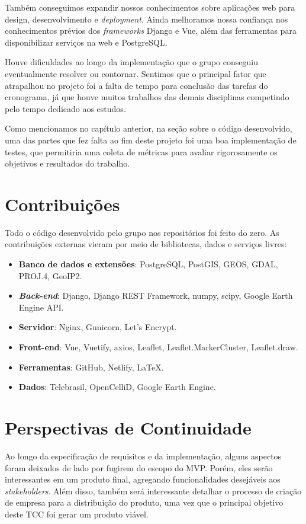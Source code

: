 \documentclass[]{politex}
\begin{document}
Também conseguimos expandir nossos conhecimentos sobre aplicações web
para design, desenvolvimento e \textit{deployment}. Ainda melhoramos nossa
confiança nos conhecimentos prévios dos \textit{frameworks} Django e Vue, além
das ferramentas para disponibilizar serviços na web e PostgreSQL.

Houve dificuldades ao longo da implementação que o grupo conseguiu
eventualmente resolver ou contornar. Sentimos que o principal fator que
atrapalhou no projeto foi a falta de tempo para conclusão das tarefas do
cronograma, já que houve muitos trabalhos das demais disciplinas competindo
pelo tempo dedicado aos estudos.

Como mencionamos no capítulo anterior, na seção sobre o código desenvolvido,
uma das partes que fez falta ao fim deste projeto foi uma boa implementação de
testes, que permitiria uma coleta de métricas para avaliar rigorosamente os
objetivos e resultados do trabalho.

\section{Contribuições}

Todo o código desenvolvido pelo grupo nos repositórios foi feito do zero. As
contribuições externas vieram por meio de bibliotecas, dados e serviços livres:

\begin{itemize}
\item \textbf{Banco de dados e extensões}: PostgreSQL, PostGIS, GEOS, GDAL,
PROJ.4, GeoIP2.
\item \textbf{\textit{Back-end}}: Django, Django REST Framework, numpy, scipy,
Google Earth Engine API.
\item \textbf{Servidor}: Nginx, Gunicorn, Let's Encrypt.
\item \textbf{Front-end}: Vue, Vuetify, axios, Leaflet, Leaflet.MarkerCluster,
Leaflet.draw.
\item \textbf{Ferramentas}: GitHub, Netlify, LaTeX.
\item \textbf{Dados}: Telebrasil, OpenCelliD, Google Earth Engine.
\end{itemize}

\section{Perspectivas de Continuidade}

Ao longo da especificação de requisitos e da implementação, alguns aspectos
foram deixados de lado por fugirem do escopo do MVP. Porém, eles serão
interessantes em um produto final, agregando funcionalidades desejáveis aos
\textit{stakeholders}. Além disso, também será interessante detalhar o processo
de criação de empresa para a distribuição do produto, uma vez que o principal
objetivo deste TCC foi gerar um produto viável.
\end{document}
